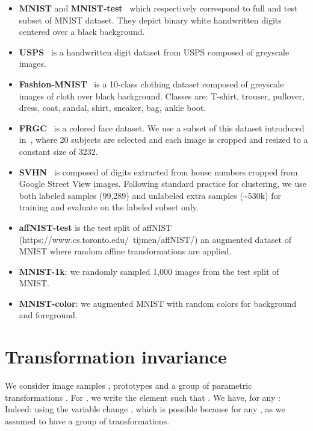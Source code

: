 \documentclass{article}
\begin{document}
\begin{itemize}[topsep=0pt,partopsep=0pt,parsep=0pt,leftmargin=7mm]
  \item \textbf{MNIST}  and {\bf MNIST-test}~\cite{lecunGradientBasedLearningApplied1998} 
    which respectively correspond to full and test subset of MNIST dataset. They depict 
    binary white handwritten digits centered over a black background.
  \item \textbf{USPS}~\cite{hastie01statisticallearning} is a handwritten digit dataset from  
    USPS composed of greyscale images.
  \item \textbf{Fashion-MNIST}~\cite{xiao2017fashion} is a 10-class 
    clothing dataset composed of greyscale images of cloth over black background. Classes 
    are: T-shirt, trouser, pullover, dress, coat, sandal, shirt, sneaker, bag, ankle boot.
  \item \textbf{FRGC}~\cite{FRGC} is a colored face dataset. We use a subset of this dataset
    introduced in~\cite{yangJointUnsupervisedLearning2016}, where 20 subjects are selected 
    and each image is cropped and resized to a constant size of 3232.
  \item \textbf{SVHN}~\cite{netzer2011reading} is composed of digits extracted from house 
    numbers cropped from Google Street View images. Following standard practice for
    clustering, we use both labeled samples (99,289) and unlabeled extra samples 
    (\textasciitilde 530k) for training and evaluate on the labeled subset only.
  \item \textbf{affNIST-test} is the test split of affNIST 
    (https://www.cs.toronto.edu/~tijmen/affNIST/) an augmented dataset of
    MNIST where random affine transformations are applied.
  \item \textbf{MNIST-1k}: we randomly sampled 1,000 images from the test split of MNIST.
  \item \textbf{MNIST-color}: we augmented MNIST with random colors for background and 
    foreground.
\end{itemize}

\section{Transformation invariance}\label{sec:proof}

We consider  image samples ,  prototypes  and a group of parametric 
transformations .  For , we write 
 the element such that . We have, for any :
Indeed:\vspace{-0.5em}
using the variable change , which is possible because for any 
,  as we assumed to have a group of transformations.
\end{document}
